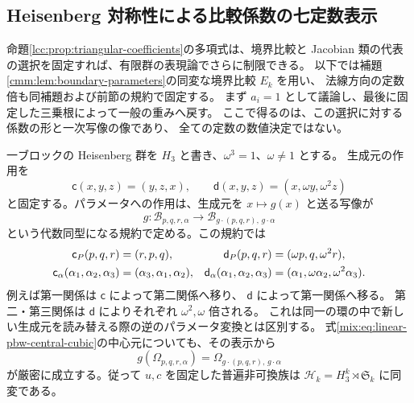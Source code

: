 \subsection{Heisenberg 対称性による比較係数の七定数表示}
\label{lec:subsec:equivariant-coefficients}

命題\ref{lcc:prop:triangular-coefficients}の多項式は、境界比較と
Jacobian 類の代表の選択を固定すれば、有限群の表現論でさらに制限できる。
以下では補題\ref{cmm:lem:boundary-parameters}の同変な境界比較 $E_k$ を用い、
法線方向の定数倍も同補題および前節の規約で固定する。
まず $a_i=1$ として議論し、最後に固定した三乗根によって一般の重みへ戻す。
ここで得るのは、この選択に対する係数の形と一次写像の像であり、
全ての定数の数値決定ではない。

一ブロックの Heisenberg 群を $H_3$ と書き、$\omega^3=1$、$\omega\ne1$ とする。
生成元の作用を
\[
 \mathsf c(x,y,z)=(y,z,x),\qquad
 \mathsf d(x,y,z)=(x,\omega y,\omega^2z)
\]
と固定する。パラメータへの作用は、生成元を $x\mapsto g(x)$ と送る写像が
\[
 g:\mathcal B_{p,q,r,\alpha}\longrightarrow
       \mathcal B_{g\cdot(p,q,r),\,g\cdot\alpha}
\]
という代数同型になる規約で定める。この規約では
\begin{align}
 \mathsf c_P(p,q,r)&=(r,p,q),&
 \mathsf d_P(p,q,r)&=(\omega p,q,\omega^2r),\label{lec:eq:parameter-actions}\\
 \mathsf c_\alpha(\alpha_1,\alpha_2,\alpha_3)
   &=(\alpha_3,\alpha_1,\alpha_2),&
 \mathsf d_\alpha(\alpha_1,\alpha_2,\alpha_3)
   &=(\alpha_1,\omega\alpha_2,\omega^2\alpha_3).\notag
\end{align}
例えば第一関係は $\mathsf c$ によって第二関係へ移り、
$\mathsf d$ によって第一関係へ移る。
第二・第三関係は $\mathsf d$ によりそれぞれ $\omega^2,\omega$ 倍される。
これは同一の環の中で新しい生成元を読み替える際の逆のパラメータ変換とは区別する。
式\eqref{mix:eq:linear-pbw-central-cubic}の中心元についても、その表示から
\[
                 g(\Omega_{p,q,r,\alpha})
                    =\Omega_{g\cdot(p,q,r),\,g\cdot\alpha}
\]
が厳密に成立する。従って $u,c$ を固定した普遍非可換族は
$\mathcal H_k=H_3^k\rtimes\mathfrak S_k$ に同変である。

